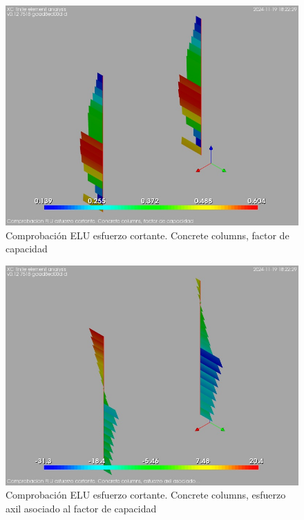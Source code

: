 \begin{figure}[ht]
\begin{center}
\includegraphics[width=\linewidth]{results/graphics/shearULS/columnZconcrCF}
\caption{Comprobación ELU esfuerzo cortante. Concrete columns, factor de capacidad}
\label{ULS_shearResistancecolumnZconcrCF}
\end{center}
\end{figure}
\begin{figure}[ht]
\begin{center}
\includegraphics[width=\linewidth]{results/graphics/shearULS/columnZconcrN}
\caption{Comprobación ELU esfuerzo cortante. Concrete columns, esfuerzo axil asociado al factor de capacidad}
\label{ULS_shearResistancecolumnZconcrN}
\end{center}
\end{figure}
